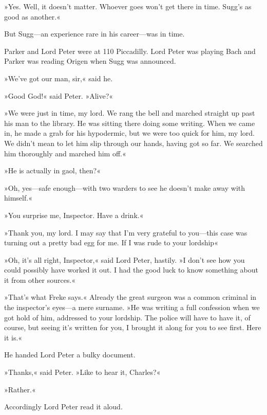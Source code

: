»Yes. Well, it doesn't matter. Whoever goes won't get there in time. Sugg's as good as another.«

But Sugg\allowbreak---\allowbreak an experience rare in his career\allowbreak---\allowbreak was in time.

Parker and Lord Peter were at 110 Piccadilly. Lord Peter was playing Bach and Parker was reading Origen when Sugg was announced.

»We've got our man, sir,« said he.

»Good God!« said Peter. »Alive?«

»We were just in time, my lord. We rang the bell and marched straight up past his man to the library. He was sitting there doing some writing. When we came in, he made a grab for his hypodermic, but we were too quick for him, my lord. We didn't mean to let him slip through our hands, having got so far. We searched him thoroughly and marched him off.«

»He is actually in gaol, then?«

»Oh, yes\allowbreak---\allowbreak safe enough\allowbreak---\allowbreak with two warders to see he doesn't make away with himself.«

»You surprise me, Inspector. Have a drink.«

»Thank you, my lord. I may say that I'm very grateful to you\allowbreak---\allowbreak this case was turning out a pretty bad egg for me. If I was rude to your lordship\longdash«

»Oh, it's all right, Inspector,« said Lord Peter, hastily. »I don't see how you could possibly have worked it out. I had the good luck to know something about it from other sources.«

»That's what Freke says.« Already the great surgeon was a common criminal in the inspector's eyes\allowbreak---\allowbreak a mere surname. »He was writing a full confession when we got hold of him, addressed to your lordship. The police will have to have it, of course, but seeing it's written for you, I brought it along for you to see first. Here it is.«

He handed Lord Peter a bulky document.

»Thanks,« said Peter. »Like to hear it, Charles?«

»Rather.«

Accordingly Lord Peter read it aloud.
